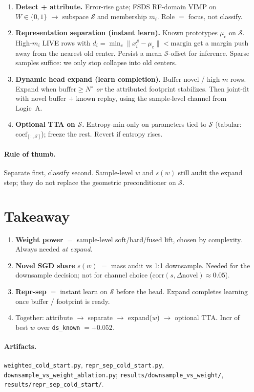 \documentclass[11pt]{article}
\begin{document}
\begin{enumerate}
  \item \textbf{Detect + attribute.}
        Error-rise gate; FSDS RF-domain VIMP on $W\in\{0,1\}$
        $\to$ subspace $\mathcal{S}$ and membership $m_i$.
        Role $=$ focus, not classify.
  \item \textbf{Representation separation (instant learn).}
        Known prototypes $\mu_c$ on $\mathcal{S}$.
        High-$m_i$ LIVE rows with
        $d_i=\min_c\|x_i^{\mathcal{S}}-\mu_c\|<\mathrm{margin}$
        get a margin push away from the nearest old center.
        Persist a mean $\mathcal{S}$-offset for inference.
        Sparse samples suffice: we only stop collapse into old centers.
  \item \textbf{Dynamic head expand (learn completion).}
        Buffer novel / high-$m$ rows. Expand when
        $\mathrm{buffer}\ge N^\star$ \emph{or} the attributed footprint
        stabilizes. Then joint-fit with novel buffer $+$ known replay,
        using the sample-level channel from Logic~A.
  \item \textbf{Optional TTA on $\mathcal{S}$.}
        Entropy-min only on parameters tied to $\mathcal{S}$
        (tabular: $\mathrm{coef}_{[:,\mathcal{S}]}$); freeze the rest.
        Revert if entropy rises.
\end{enumerate}

\paragraph{Rule of thumb.}
Separate first, classify second.
Sample-level $w$ and $s(w)$ still audit the expand step;
they do not replace the geometric preconditioner on $\mathcal{S}$.

\section{Takeaway}

\begin{enumerate}
  \item \textbf{Weight power} $=$ sample-level soft/hard/fused lift, chosen by
        complexity. Always needed \emph{at expand}.
  \item \textbf{Novel SGD share} $s(w)$ $=$ mass audit vs 1:1 downsample.
        Needed for the downsample decision; not for channel choice
        ($\mathrm{corr}(s,\Delta\mathrm{novel})\approx 0.05$).
  \item \textbf{Repr-sep} $=$ instant learn on $\mathcal{S}$ before the head.
        Expand completes learning once buffer / footprint is ready.
  \item Together: attribute $\to$ separate $\to$ expand($w$) $\to$ optional TTA.
        Incr of best $w$ over \texttt{ds\_known} $=+0.052$.
\end{enumerate}

\paragraph{Artifacts.}
\texttt{weighted\_cold\_start.py},
\texttt{repr\_sep\_cold\_start.py},
\texttt{downsample\_vs\_weight\_ablation.py};
\texttt{results/downsample\_vs\_weight/},
\texttt{results/repr\_sep\_cold\_start/}.
\end{document}
